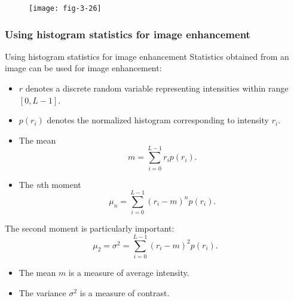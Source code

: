 
\begin{frame}
\begin{figure}
\centering
\texttt{[image: fig-3-26]}
\end{figure}
\end{frame}


\subsubsection{Using histogram statistics for image enhancement}


\begin{frame}{Using histogram statistics for image enhancement}
Statistics obtained from an image can be used for image enhancement:
\begin{itemize}
\item $r$ denotes a discrete random variable representing intensities within range $[0,L-1]$.
\item $p(r_{i})$ denotes the normalized histogram corresponding to intensity $r_{i}$.
\item The mean
\begin{equation}
m = \sum_{i=0}^{L-1}r_{i}p(r_{i}).
\end{equation}
\item The \textit{n}th moment
\begin{equation}
\mu_{n} = \sum_{i=0}^{L-1} \left ( r_{i} - m \right )^{n} p(r_{i}).
\end{equation}
\end{itemize}
\end{frame}


\begin{frame}
The second moment is particularly important:
\begin{equation}
\mu_{2} = \sigma^{2} = \sum_{i=0}^{L-1} \left ( r_{i} - m \right )^{2} p(r_{i}).
\end{equation}
\begin{itemize}
\item The mean $m$ is a measure of average intensity.
\item The variance $\sigma^{2}$ is a measure of contrast.
\end{itemize}
\end{frame}

